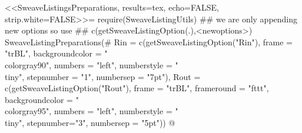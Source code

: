 \RequirePackage{fancyvrb}
\RequirePackage{listings}
<<SweaveListingsPreparations, results=tex, echo=FALSE, strip.white=FALSE>>=
require(SweaveListingUtils)
 ## we are only appending new options so use
 ## c(getSweaveListingOption(.),<newoptions>)
SweaveListingPreparations(#
        Rin = c(getSweaveListingOption("Rin"),
                frame = "trBL",
                backgroundcolor = "\\color{gray90}",
                numbers = "left",
                numberstyle = "\\tiny",
                stepnumber = "1",
                numbersep = "7pt"),
        Rout = c(getSweaveListingOption("Rout"),
                 frame = "trBL",
                 frameround = "fttt",
                 backgroundcolor = "\\color{gray95}",
                 numbers = "left",
                 numberstyle = "\\tiny",
                 stepnumber="3",
                 numbersep = "5pt"))
@
